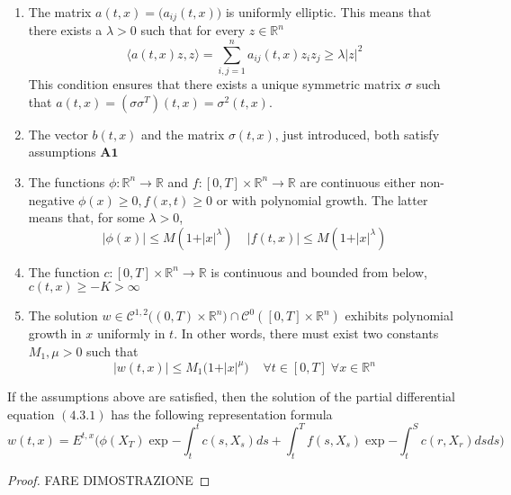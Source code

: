 \begin{enumerate}
    \item The matrix $a(t,x) = \big(a_{ij}(t,x)\big)$ is uniformly elliptic. This means that there exists a $\lambda > 0$ such that for every $z \in \mathbb{R}^n$
    \begin{equation*}
        \langle a(t,x) z, z \rangle = \sum_{i,j=1}^n a_{ij}(t,x) z_i z_j \geq \lambda \vert z \vert^2
    \end{equation*}
    This condition ensures that there exists a unique symmetric matrix $\sigma$ such that $a(t,x) = (\sigma \sigma^T)(t,x) = \sigma^2(t,x)$. 

    \item The vector $b(t,x)$ and the matrix $\sigma(t,x)$, just introduced, both satisfy assumptions $\textbf{A1}$

    \item The functions $\phi : \mathbb{R}^n \to \mathbb{R}$ and $f : [0,T] \times \mathbb{R}^n \to \mathbb{R}$ are continuous either non-negative $\phi(x) \geq 0, f(x,t) \geq 0$ or with polynomial growth. The latter means that, for some $\lambda > 0$, 
    \begin{equation*}
        \vert \phi(x) \vert \leq M(1+\vert x \vert^{\lambda}) \;\;\;\; \vert f(t,x) \vert \leq M(1+\vert x \vert^{\lambda})
    \end{equation*}

    \item The function $c : [0,T] \times \mathbb{R}^n \to \mathbb{R}$ is continuous and bounded from below, $c(t,x) \geq -K > \infty$

    \item The solution $w \in \mathcal{C}^{1,2}\big((0,T) \times \mathbb{R}^n\big) \cap \mathcal{C}^0([0,T]\times \mathbb{R}^n)$ exhibits polynomial growth in $x$ uniformly in $t$. In other words, there must exist two constants $M_1,\mu > 0$ such that
    \begin{equation*}
        \vert w(t,x) \vert \leq M_1 \big(1+\vert x \vert^{\mu}\big) \;\;\;\; \forall t \in [0,T] \; \forall x \in \mathbb{R}^n
    \end{equation*}
\end{enumerate}

\begin{theorem}
    If the assumptions above are satisfied, then the solution of the partial differential equation $(4.3.1)$ has the following representation formula
    \begin{equation}
        w(t,x) = E^{t,x} \Bigg( \phi(X_T) \exp{-\int_t^t c(s,X_s) ds} + \int_t^T f(s,X_s) \exp{-\int_t^S c(r,X_r) ds} ds \Bigg)
    \end{equation}
\end{theorem}
\begin{proof}
    FARE DIMOSTRAZIONE
\end{proof}

